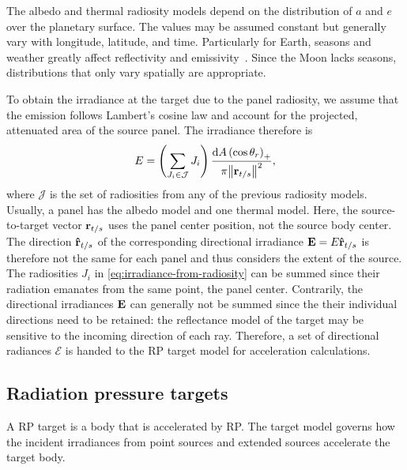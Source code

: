 The albedo and thermal radiosity models depend on the distribution of $a$ and $e$ over the planetary surface. The values may be assumed constant but generally vary with longitude, latitude, and time. Particularly for Earth, seasons and weather greatly affect reflectivity and emissivity~\cite{Goode2001}. Since the Moon lacks seasons, distributions that only vary spatially are appropriate.

To obtain the irradiance at the target due to the panel radiosity, we assume that the emission follows Lambert's cosine law and account for the projected, attenuated area of the source panel. The irradiance therefore is
\begin{align}
    \label{eq:irradiance-from-radiosity}
    E = \left(\sum_{J_i \in \mathcal{J}} J_i\right) \frac{\dd{A} \left(\cos\theta_r\right)_+}{\pi\norm{\vb r_{t/s}}^2},
\end{align}
where $\mathcal{J}$ is the set of radiosities from any of the previous radiosity models. Usually, a panel has the albedo model and one thermal model. Here, the source-to-target vector $\vb r_{t/s}$ uses the panel center position, not the source body center. The direction $\vu r_{t/s}$ of the corresponding directional irradiance $\vb E = E \vu r_{t/s}$  is therefore not the same for each panel and thus considers the extent of the source. The radiosities $J_i$ in \cref{eq:irradiance-from-radiosity} can be summed since their radiation emanates from the same point, the panel center. Contrarily, the directional irradiances $\vb E$ can generally not be summed since the their  individual directions need to be retained: the reflectance model of the target may be sensitive to the incoming direction of each ray. Therefore, a set of directional radiances $\mathcal{E}$ is handed to the \gls{RP} target model for acceleration calculations.




\subsection{Radiation pressure targets}
\label{subsec:radiation-pressure-targets}

A \gls{RP} target is a body that is accelerated by \gls{RP}. The target model governs how the incident irradiances from point sources and extended sources accelerate the target body.


